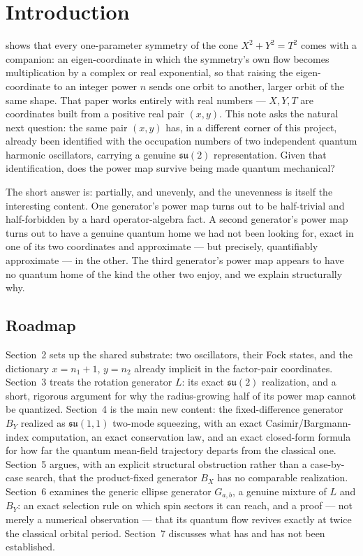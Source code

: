 \documentclass[11pt]{amsart}
\theoremstyle{remark}
\begin{document}
\section{Introduction}

\cite{Ebert2026EigenCoord} shows that every one-parameter symmetry of the cone $X^2+Y^2=T^2$ comes with a companion: an eigen-coordinate in which the symmetry's own flow becomes multiplication by a complex or real exponential, so that raising the eigen-coordinate to an integer power $n$ sends one orbit to another, larger orbit of the same shape. That paper works entirely with real numbers --- $X,Y,T$ are coordinates built from a positive real pair $(x,y)$. This note asks the natural next question: the same pair $(x,y)$ has, in a different corner of this project, already been identified with the occupation numbers of two independent quantum harmonic oscillators, carrying a genuine $\mathfrak{su}(2)$ representation. Given that identification, does the power map survive being made quantum mechanical?

The short answer is: partially, and unevenly, and the unevenness is itself the interesting content. One generator's power map turns out to be half-trivial and half-forbidden by a hard operator-algebra fact. A second generator's power map turns out to have a genuine quantum home we had not been looking for, exact in one of its two coordinates and approximate --- but precisely, quantifiably approximate --- in the other. The third generator's power map appears to have no quantum home of the kind the other two enjoy, and we explain structurally why.

\subsection*{Roadmap} Section~2 sets up the shared substrate: two oscillators, their Fock states, and the dictionary $x=n_1+1$, $y=n_2$ already implicit in the factor-pair coordinates. Section~3 treats the rotation generator $L$: its exact $\mathfrak{su}(2)$ realization, and a short, rigorous argument for why the radius-growing half of its power map cannot be quantized. Section~4 is the main new content: the fixed-difference generator $B_Y$ realized as $\mathfrak{su}(1,1)$ two-mode squeezing, with an exact Casimir/Bargmann-index computation, an exact conservation law, and an exact closed-form formula for how far the quantum mean-field trajectory departs from the classical one. Section~5 argues, with an explicit structural obstruction rather than a case-by-case search, that the product-fixed generator $B_X$ has no comparable realization. Section~6 examines the generic ellipse generator $G_{a,b}$, a genuine mixture of $L$ and $B_Y$: an exact selection rule on which spin sectors it can reach, and a proof --- not merely a numerical observation --- that its quantum flow revives exactly at twice the classical orbital period. Section~7 discusses what has and has not been established.
\end{document}
